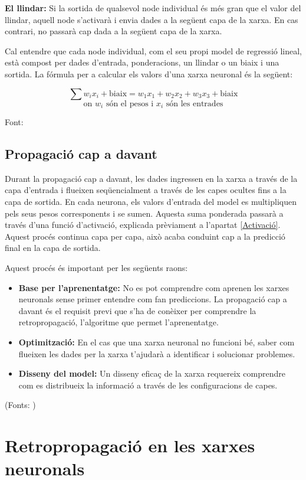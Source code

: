 \textbf{El llindar:} Si la sortida de qualsevol node individual és més gran que el valor del llindar, aquell node s'activarà i envia dades a la següent capa de la xarxa. En cas contrari, no passarà cap dada a la següent capa de la xarxa.

Cal entendre que cada node individual, com el seu propi model de regressió lineal, està compost per dades d'entrada, ponderacions, un llindar o un biaix i una sortida. La fórmula per a calcular els valors d'una xarxa neuronal és la següent:

$$
\sum w_i x_i + \text{biaix} = w_1 x_1 + w_2 x_2 + w_3 x_3 + \text{biaix}$$
$$\text{on } w_i \text{ són el pesos i } x_i\text{ són les entrades}
$$

Font: \cite{IMB_Xarxa_neuronal}

\subsection{Propagació cap a davant}\label{subsec:propagació}
Durant la propagació cap a davant, les dades ingressen en la xarxa a través de la capa d'entrada i flueixen seqüencialment a través de les capes ocultes fins a la capa de sortida. En cada neurona, els valors d'entrada del model es multipliquen pels seus pesos corresponents i se sumen. Aquesta suma ponderada passarà a través d'una funció d'activació, explicada prèviament a l'apartat \ref{Activació}. Aquest procés continua capa per capa, això acaba conduint cap a la predicció final en la capa de sortida.

Aquest procés és important per les següents raons:
\begin{itemize}
    \item \textbf{Base per l'aprenentatge:} No es pot comprendre com aprenen les xarxes neuronals sense primer entendre com fan prediccions. La propagació cap a davant és el requisit previ que s'ha de conèixer per comprendre la retropropagació, l'algoritme que permet l'aprenentatge.
    \item \textbf{Optimització:} En el cas que una xarxa neuronal no funcioni bé, saber com flueixen les dades per la xarxa t'ajudarà a identificar i solucionar problemes.
    \item \textbf{Disseny del model:} Un disseny eficaç de la xarxa requereix comprendre com es distribueix la informació a través de les configuracions de capes.
\end{itemize}
(Fonts: \cite{TreballFinalDeGrau2})
\section{Retropropagació en les xarxes neuronals}\label{subsec:retropropagació}

